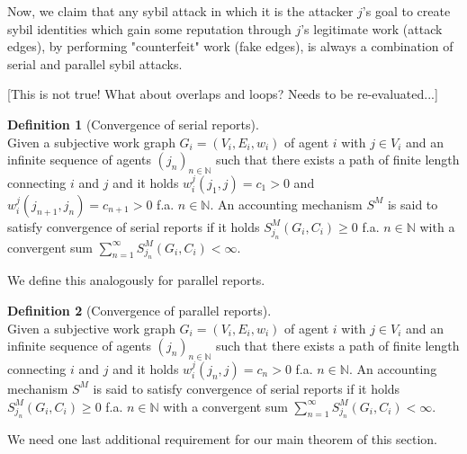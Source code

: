 \documentclass[11pt,a4paper]{report}
\theoremstyle{definition}
\newtheorem{definition}{Definition}[section]
\theoremstyle{theorem}
\theoremstyle{proposition}
\theoremstyle{corollary}
\theoremstyle{lemma}
\theoremstyle{example}
\theoremstyle{remark}
\begin{document}
\noindent{}Now, we claim that any sybil attack in which it is the attacker $j$'s goal to create sybil identities which gain some reputation through $j$'s legitimate work (attack edges), by performing "counterfeit" work (fake edges), is always a combination of serial and parallel sybil attacks. \begin{center} [This is not true! What about overlaps and loops? Needs to be re-evaluated...] \vspace{1em}\\\end{center}

\begin{definition}[Convergence of serial reports]\ \\
Given a subjective work graph $G_i=(V_i,E_i,w_i)$ of agent $i$ with $j\in{}V_i$ and an infinite sequence of agents $(j_n)_{n\in\mathbb{N}}$ such that there exists a path of finite length connecting $i$ and $j$ and it holds $w_i^j(j_1,j)=c_1 > 0$ and $w_i^j(j_{n+1},j_n)=c_{n+1}>0$ f.a. $n\in\mathbb{N}$. An accounting mechanism $S^M$ is said to satisfy convergence of serial reports if it holds $S^M_{j_n}(G_i,C_i)\geq{}0$ f.a. $n\in\mathbb{N}$ with a convergent sum $\sum\limits_{n=1}^{\infty}S^M_{j_n}(G_i,C_i)<\infty$. 
\end{definition}

\noindent{}We define this analogously for parallel reports. \vspace{1em}\\

\begin{definition}[Convergence of parallel reports]\ \\
Given a subjective work graph $G_i=(V_i,E_i,w_i)$ of agent $i$ with $j\in{}V_i$ and an infinite sequence of agents $(j_n)_{n\in\mathbb{N}}$ such that there exists a path of finite length connecting $i$ and $j$ and it holds $w_i^j(j_n,j)=c_n > 0$ f.a. $n\in\mathbb{N}$. An accounting mechanism $S^M$ is said to satisfy convergence of serial reports if it holds $S^M_{j_n}(G_i,C_i)\geq{}0$ f.a. $n\in\mathbb{N}$ with a convergent sum $\sum\limits_{n=1}^{\infty}S^M_{j_n}(G_i,C_i)<\infty$.
\end{definition}

\noindent{}We need one last additional requirement for our main theorem of this section. \vspace{1em}\\
\end{document}
